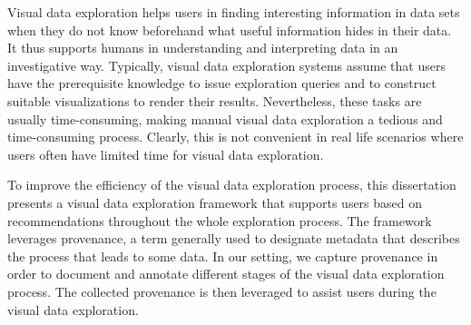 Visual data exploration helps users in finding interesting information in data sets when they do not know beforehand what useful information hides in their data. It thus supports humans in understanding and interpreting data in an investigative way.
Typically, visual data exploration systems assume that users have the prerequisite knowledge to issue exploration queries and to construct suitable visualizations to render their results. Nevertheless, these tasks are usually time-consuming, making manual visual data exploration a tedious and time-consuming process.
Clearly, this is not convenient in real life scenarios where users often have limited time for visual data exploration. 


To improve the efficiency of the visual data exploration process, this dissertation presents a visual data exploration framework that supports users based on recommendations throughout the whole exploration process.
%
The framework leverages provenance, a term generally used to designate metadata that describes the process that leads to some data. 
In our setting, we capture provenance in order to document and annotate different stages of the visual data exploration process.  
The collected provenance is then leveraged to assist users during the visual data exploration.

